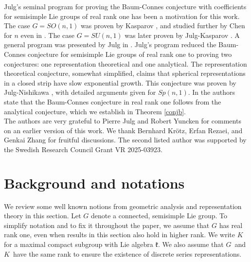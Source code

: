 \documentclass[a4paper,reqno]{amsart}
\numberwithin{equation}{section}
\theoremstyle{definition}
\theoremstyle{remark}
\begin{document}
Julg's seminal program for proving the Baum-Connes conjecture with coefficients for semisimple Lie groups of real rank one has been a motivation for this work. The case $G=SO(n,1)$ was proven by Kasparov \cite{kaspson}, and studied further by Chen for $n$ even in \cite{chenson}. The case $G=SU(n,1)$ was later proven by Julg-Kasparov \cite{julgkasp}. A general program was presented by Julg in \cite{julghow}. Julg's program reduced the Baum-Connes conjecture for semisimple Lie groups of real rank one to proving two conjectures: one representation theoretical and one analytical. The representation theoretical  conjecture, somewhat simplified, claims that spherical representations in a closed strip have slow exponential growth. This conjecture was proven by Julg-Nishikawa \cite[Theorem C]{julgnishi}, with detailed arguments given for $Sp(n,1)$. In \cite{julgnishi} the authors state that the Baum-Connes conjecture in real rank one follows from the analytical conjecture, which we establish in Theorem \ref{conjb}. \\






The authors are very grateful to Pierre Julg and Robert Yuncken for comments on an earlier version of this work. We thank Bernhard Kr\"{o}tz, Erfan Rezaei, and Genkai Zhang for fruitful discussions. The second listed author was supported by the Swedish Research Council Grant VR 2025-03923.

\section{Background and notations}
\label{secback}

We review some well known notions from geometric analysis and representation theory in this section. Let $G$ denote a connected, semisimple Lie group. To simplify notation and to fix it throughout the paper, we assume that $G$ has real rank one, even when results in this section also hold in higher rank. We write $K$ for a maximal compact subgroup with Lie algebra $\mathfrak{k}$. We also assume that $G$ and $K$ have the same rank to ensure the existence of discrete series representations.
\end{document}

